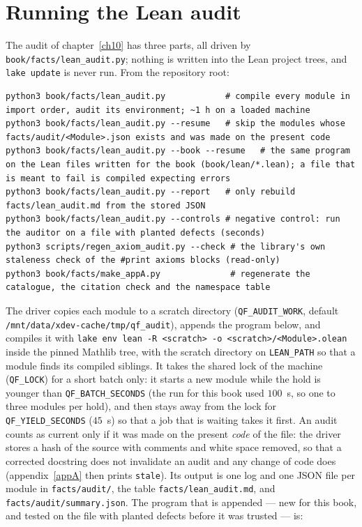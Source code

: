 \section{Running the Lean audit}\label{appB:audit}
The audit of chapter~\ref{ch10} has three parts, all driven by \texttt{book/\allowbreak{}facts/\allowbreak{}lean\_\allowbreak{}audit.\allowbreak{}py}; nothing is written into the Lean project trees, and \texttt{lake update} is never run. From the repository root:
\begin{lstlisting}[style=plainmono]
python3 book/facts/lean_audit.py            # compile every module in import order, audit its environment; ~1 h on a loaded machine
python3 book/facts/lean_audit.py --resume   # skip the modules whose facts/audit/<Module>.json exists and was made on the present code
python3 book/facts/lean_audit.py --book --resume   # the same program on the Lean files written for the book (book/lean/*.lean); a file that is meant to fail is compiled expecting errors
python3 book/facts/lean_audit.py --report   # only rebuild facts/lean_audit.md from the stored JSON
python3 book/facts/lean_audit.py --controls # negative control: run the auditor on a file with planted defects (seconds)
python3 scripts/regen_axiom_audit.py --check # the library's own staleness check of the #print axioms blocks (read-only)
python3 book/facts/make_appA.py              # regenerate the catalogue, the citation check and the namespace table
\end{lstlisting}
The driver copies each module to a scratch directory (\texttt{QF\_\allowbreak{}AUDIT\_\allowbreak{}WORK}, default \texttt{/\allowbreak{}mnt/\allowbreak{}data/\allowbreak{}xdev-cache/\allowbreak{}tmp/\allowbreak{}qf\_\allowbreak{}audit}), appends the program below, and compiles it with \texttt{lake env lean -R <scratch> -o <scratch>/<Module>.olean} inside the pinned Mathlib tree, with the scratch directory on \texttt{LEAN\_PATH} so that a module finds its compiled siblings. It takes the shared lock of the machine (\texttt{QF\_LOCK}) for a short batch only: it starts a new module while the hold is younger than \texttt{QF\_\allowbreak{}BATCH\_\allowbreak{}SECONDS} (the run for this book used $100$~s, so one to three modules per hold), and then stays away from the lock for \texttt{QF\_\allowbreak{}YIELD\_\allowbreak{}SECONDS} ($45$~s) so that a job that is waiting takes it first. An audit counts as current only if it was made on the present \emph{code} of the file: the driver stores a hash of the source with comments and white space removed, so that a corrected docstring does not invalidate an audit and any change of code does (appendix~\ref{appA} then prints \texttt{stale}). Its output is one log and one JSON file per module in \texttt{facts/audit/}, the table \texttt{facts/\allowbreak{}lean\_\allowbreak{}audit.\allowbreak{}md}, and \texttt{facts/\allowbreak{}audit/\allowbreak{}summary.\allowbreak{}json}. The program that is appended --- new for this book, and tested on the file with planted defects before it was trusted --- is:
